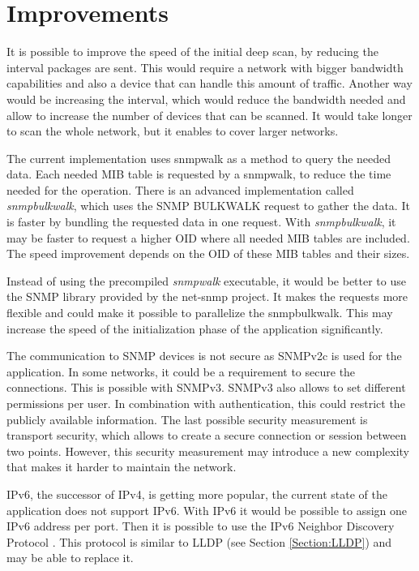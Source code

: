 \section{Improvements}
\label{Section:CAF-Improvements}

It is possible to improve the speed of the initial deep scan, by reducing the interval packages are sent. This would require a network with bigger bandwidth capabilities and also a device that can handle this amount of traffic. Another way would be increasing the interval, which would reduce the bandwidth needed and allow to increase the number of devices that can be scanned. It would take longer to scan the whole network, but it enables to cover larger networks.

The current implementation uses snmpwalk as a method to query the needed data. Each needed MIB table is requested by a snmpwalk, to reduce the time needed for the operation. There is an advanced implementation called \textit{snmpbulkwalk}, which uses the SNMP BULKWALK request to gather the data. It is faster by bundling the requested data in one request. With \textit{snmpbulkwalk}, it may be faster to request a higher OID where all needed MIB tables are included. The speed improvement depends on the OID of these MIB tables and their sizes.

Instead of using the precompiled \textit{snmpwalk} executable, it would be better to use the SNMP library provided by the net-snmp project. It makes the requests more flexible and could make it possible to parallelize the snmpbulkwalk. This may increase the speed of the initialization phase of the application significantly.

The communication to SNMP devices is not secure as SNMPv2c is used for the application. In some networks, it could be a requirement to secure the connections. This is possible with SNMPv3. SNMPv3 also allows to set different permissions per user. In combination with authentication, this could restrict the publicly available information. The last possible security measurement is transport security, which allows to create a secure connection or session between two points. However, this security measurement may introduce a new complexity that makes it harder to maintain the network.

IPv6, the successor of IPv4, is getting more popular, the current state of the application does not support IPv6. With IPv6 it would be possible to assign one IPv6 address per port. Then it is possible to use the IPv6 Neighbor Discovery Protocol \cite{RFC:RFC4861:2007}. This protocol is similar to LLDP (see Section \ref{Section:LLDP}) and may be able to replace it.

